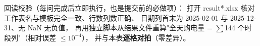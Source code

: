 \begin{guideblock}
回读校验（每问完成后立即执行，也是提交前的必做项）：
打开 result*.xlsx 核对工作表名与模板完全一致、行数列数正确、
日期列首末为 2025-02-01 与 2025-12-31、无 NaN 无负值，
再用独立脚本从结果文件重算"全天购电量 = \(\sum\)144 个时段列"（相对误差 \(\le 10^{-4}\)），
并与本表\textbf{逐格对拍}（零差异）。
\end{guideblock}
